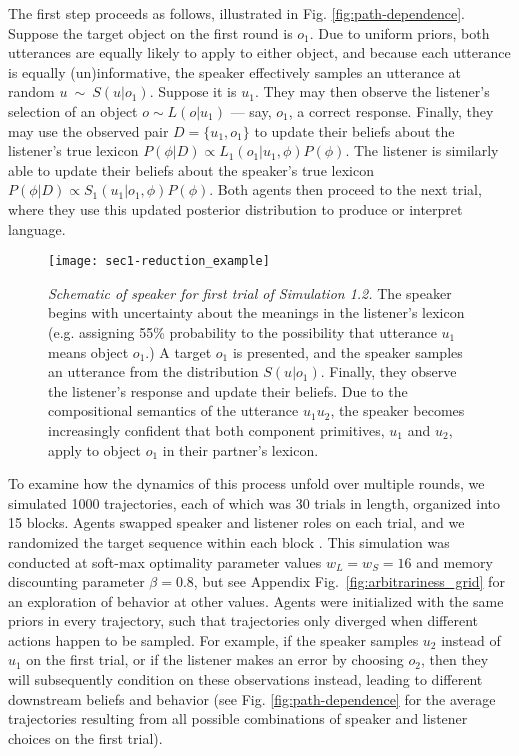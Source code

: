 The first step proceeds as follows, illustrated in Fig. \ref{fig:path-dependence}.
Suppose the target object on the first round is $o_1$.
Due to uniform priors, both utterances are equally likely to apply to either object, and because each utterance is equally (un)informative, the speaker effectively samples an utterance at random $u~\sim~S(u|o_1)$.
Suppose it is $u_1$.
They may then observe the listener's selection of an object $o \sim L(o | u_1)$ --- say, $o_1$, a correct response.
Finally, they may use the observed pair $D = \{u_1, o_1\}$ to update their beliefs about the listener's true lexicon $P(\phi | D)\propto L_1(o_1 | u_1, \phi)P(\phi)$.
The listener is similarly able to update their beliefs about the speaker's true lexicon $P(\phi | D)\propto S_1(u_1 | o_1, \phi)P(\phi)$. 
Both agents then proceed to the next trial, where they use this updated posterior distribution to produce or interpret language.
\begin{figure*}
\centering
    \texttt{[image: sec1-reduction\_example]}
    \vspace{1em}
  \caption{\emph{Schematic of speaker for first trial of Simulation 1.2.} The speaker begins with uncertainty about the meanings in the listener's lexicon (e.g. assigning 55\% probability to the possibility that utterance $u_1$ means object $o_1$.) A target $o_1$ is presented, and the speaker samples an utterance from the distribution $S(u|o_1)$. Finally, they observe the listener's response and update their beliefs. Due to the compositional semantics of the utterance $u_1u_2$, the speaker becomes increasingly confident that both component primitives, $u_1$ and $u_2$, apply to object $o_1$ in their partner's lexicon.}
  \label{fig:sec1efficiency}
\end{figure*}

To examine how the dynamics of this process unfold over multiple rounds, we simulated 1000 trajectories, each of which was 30 trials in length, organized into 15 blocks.
Agents swapped speaker and listener roles on each trial, and we randomized the target sequence within each block .
This simulation was conducted at soft-max optimality parameter values $w_L = w_S = 16$ and memory discounting parameter $\beta = 0.8$, but see Appendix Fig.~\ref{fig:arbitrariness_grid} for an exploration of behavior at other values.
Agents were initialized with the same priors in every trajectory, such that trajectories only diverged when different actions happen to be sampled.
For example, if the speaker samples $u_2$ instead of $u_1$ on the first trial, or if the listener makes an error by choosing $o_2$, then they will subsequently condition on these observations instead, leading to different downstream beliefs and behavior (see Fig. \ref{fig:path-dependence} for the average trajectories resulting from all possible combinations of speaker and listener choices on the first trial).

